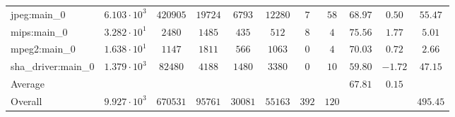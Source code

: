 \begin{tabular}{|l|c|c|c|c|c|c|c|c|c|c|}
jpeg:main\_0            & $ 6.103 \cdot 10^{3} $ & $ 420905 $ & $ 19724 $ & $ 6793  $ & $ 12280 $ & $ 7   $ & $ 58  $ & $ 68.97       $ & $ 0.50    $ & $ 55.47   $ \\
mips:main\_0            & $ 3.282 \cdot 10^{1} $ & $ 2480   $ & $ 1485  $ & $ 435   $ & $ 512   $ & $ 8   $ & $ 4   $ & $ 75.56       $ & $ 1.77    $ & $ 5.01    $ \\
mpeg2:main\_0           & $ 1.638 \cdot 10^{1} $ & $ 1147   $ & $ 1811  $ & $ 566   $ & $ 1063  $ & $ 0   $ & $ 4   $ & $ 70.03       $ & $ 0.72    $ & $ 2.66    $ \\
sha\_driver:main\_0     & $ 1.379 \cdot 10^{3} $ & $ 82480  $ & $ 4188  $ & $ 1480  $ & $ 3380  $ & $ 0   $ & $ 10  $ & $ 59.80       $ & $ -1.72   $ & $ 47.15   $ \\
\hline
Average                 & $                    $ & $        $ & $       $ & $       $ & $       $ & $     $ & $     $ & $ 67.81       $ & $ 0.15    $ & $         $ \\
\hline
Overall                 & $ 9.927 \cdot 10^{3} $ & $ 670531 $ & $ 95761 $ & $ 30081 $ & $ 55163 $ & $ 392 $ & $ 120 $ & $             $ & $         $ & $ 495.45  $ \\
\hline
\end{tabular}
